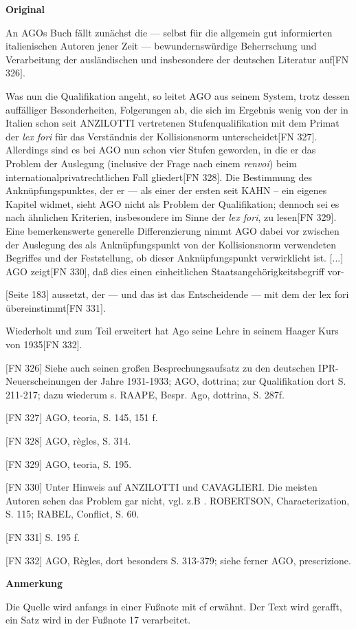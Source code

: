 \documentclass[ngerman,final,fontsize=12pt,paper=a4,twoside,bibliography=totocnumbered,BCOR=8mm,draft=false]{scrartcl}
\newenvironment{fragment}
	{\begin{snugshade}}
	{\end{snugshade}
	 \penalty-200
	 \vskip 0pt plus 10mm minus 5mm}
\newenvironment{fragmentpart}[1]
	{\noindent\textbf{#1}\par\penalty500}
	{\par}
\begin{document}
\begin{fragment}
\begin{fragmentpart}{Original \cite[S.~182--183 Z.~6--23,~183--1]{Weber-1986}}
{An AGOs Buch fällt zunächst die --- selbst für die allgemein gut informierten italienischen Autoren jener Zeit --- bewundernswürdige Beherrschung und Verarbeitung der ausländischen und insbesondere der deutschen Literatur auf$[$FN 326$]$.

Was nun die Qualifikation angeht, so leitet AGO aus seinem System, trotz dessen auffälliger Besonderheiten, Folgerungen ab, die sich im Ergebnis wenig von der in Italien schon seit ANZILOTTI vertretenen Stufenqualifikation mit dem Primat der \textsl{lex fori} für das Verständnis der Kollisionsnorm unterscheidet$[$FN 327$]$. Allerdings sind es bei AGO nun schon vier Stufen geworden, in die er das Problem der Auslegung (inclusive der Frage nach einem \textsl{renvoi}) beim internationalprivatrechtlichen Fall gliedert$[$FN 328$]$. Die Bestimmung des Anknüpfungspunktes, der er --- als einer der ersten seit  KAHN – ein eigenes Kapitel widmet, sieht AGO nicht als Problem der Qualifikation; dennoch sei es nach ähnlichen Kriterien, insbesondere im Sinne der \textsl{lex fori}, zu lesen$[$FN 329$]$. Eine bemerkenswerte generelle Differenzierung nimmt  AGO dabei vor zwischen der Auslegung des als Anknüpfungspunkt von der Kollisionsnorm verwendeten Begriffes und der Feststellung, ob dieser Anknüpfungspunkt verwirklicht ist. $[$...$]$ AGO zeigt$[$FN 330$]$, daß dies einen einheitlichen Staatsangehörigkeitsbegriff vor-

$[$Seite 183$]$
aussetzt, der --- und das ist das Entscheidende --- mit dem der lex fori übereinstimmt$[$FN 331$]$.

Wiederholt und zum Teil erweitert hat Ago seine Lehre in seinem Haager Kurs von 1935$[$FN 332$]$.

$[$FN 326$]$ Siehe auch seinen großen Besprechungsaufsatz zu den deutschen IPR-Neuerscheinungen der Jahre 1931-1933;  AGO, dottrina; zur Qualifikation dort S. 211-217; dazu wiederum s. RAAPE, Bespr. Ago, dottrina, S. 287f.

$[$FN 327$]$ AGO, teoria, S. 145, 151 f.

$[$FN 328$]$ AGO, règles, S. 314.

$[$FN 329$]$ AGO, teoria, S. 195.

$[$FN 330$]$ Unter Hinweis auf ANZILOTTI und CAVAGLIERI. Die meisten Autoren sehen das Problem gar nicht, vgl. z.B . ROBERTSON, Characterization, S. 115; RABEL, Conflict, S. 60.

$[$FN 331$]$ S. 195 f.

$[$FN 332$]$ AGO, Règles, dort besonders S. 313-379; siehe ferner AGO, prescrizione.}
\end{fragmentpart}
\begin{fragmentpart}{Anmerkung}
Die Quelle wird anfangs in einer Fußnote mit \textquotedbl{}cf\textquotedbl{} erwähnt. Der Text wird gerafft, ein Satz wird in der Fußnote 17 verarbeitet.
\end{fragmentpart}
\end{fragment}
\end{document}

